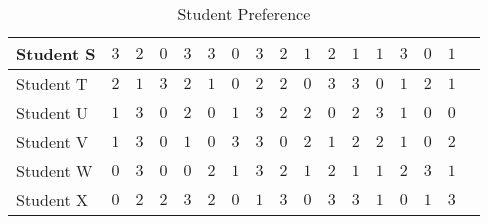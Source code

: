 \documentclass[11pt]{article}
\begin{document}
\begin{table}
\begin{tabular}{|a|p{.7cm}|p{.7cm}|p{.7cm}|p{.7cm}|p{.7cm}|p{.7cm}|p{.7cm}|p{.7cm}|p{.7cm}|p{.7cm}|p{.7cm}|p{.7cm}|p{.7cm}|c|p{.7cm}|p{.7cm}|}
Student S & $3$ & $2$ & $0$ & $3$ & $3$ & $0$
& $3$ & $2$ & $1$ & $2$ & $1$ & $1$ & $3$
& $0$ & $1$ \\ \hline
Student T & $2$ & $1$ & $3$ & $2$ & $1$ & $0$
& $2$ & $2$ & $0$ & $3$ & $3$ & $0$ & $1$
& $2$ & $1$ \\ \hline
Student U & $1$ & $3$ & $0$ & $2$ & $0$ & $1$
& $3$ & $2$ & $2$ & $0$ & $2$ & $3$ & $1$
& $0$ & $0$ \\ \hline
Student V & $1$ & $3$ & $0$ & $1$ & $0$ & $3$
& $3$ & $0$ & $2$ & $1$ & $2$ & $2$ & $1$
& $0$ & $2$ \\ \hline
Student W & $0$ & $3$ & $0$ & $0$ & $2$ & $1$
& $3$ & $2$ & $1$ & $2$ & $1$ & $1$ & $2$
& $3$ & $1$ \\ \hline
Student X & $0$ & $2$ & $2$ & $3$ & $2$ & $0$
& $1$ & $3$ & $0$ & $3$ & $3$ & $1$ & $0$
& $1$ & $3$ \\ \hline
\end{tabular}
\caption{Student Preference}
\label{table:pref}
\end{table}
\end{document}
